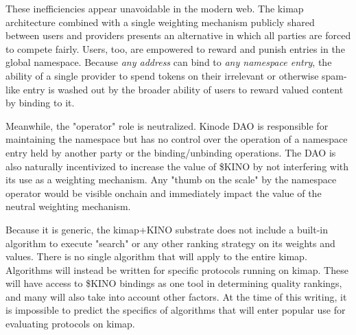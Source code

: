 \documentclass[runningheads]{llncs}
\begin{document}
These inefficiencies appear unavoidable in the modern web.
The kimap architecture combined with a single weighting mechanism publicly shared between users and providers presents an alternative in which all parties are forced to compete fairly.
Users, too, are empowered to reward and punish entries in the global namespace.
Because \textit{any address} can bind to \textit{any namespace entry}, the ability of a single provider to spend tokens on their irrelevant or otherwise spam-like entry is washed out by the broader ability of users to reward valued content by binding to it.

Meanwhile, the "operator" role is neutralized.
Kinode DAO is responsible for maintaining the namespace but has no control over the operation of a namespace entry held by another party or the binding/unbinding operations.
The DAO is also naturally incentivized to increase the value of \$KINO by not interfering with its use as a weighting mechanism.
Any "thumb on the scale" by the namespace operator would be visible onchain and immediately impact the value of the neutral weighting mechanism.

Because it is generic, the kimap+KINO substrate does not include a built-in algorithm to execute "search" or any other ranking strategy on its weights and values.
There is no single algorithm that will apply to the entire kimap.
Algorithms will instead be written for specific protocols running on kimap.
These will have access to \$KINO bindings as one tool in determining quality rankings, and many will also take into account other factors.
At the time of this writing, it is impossible to predict the specifics of algorithms that will enter popular use for evaluating protocols on kimap.
\end{document}
